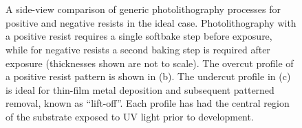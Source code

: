 \documentclass[
  a4paper,
]{scrbook}
\begin{document}
\begin{figure}
\begin{minipage}[t]{0.03\linewidth}
{

}

\end{minipage}%
%
\begin{minipage}[t]{0.01\linewidth}

{\centering 

~

}

\end{minipage}%
%
\begin{minipage}[t]{0.45\linewidth}

{\centering 


}

\end{minipage}%
%
\begin{minipage}[t]{0.01\linewidth}

{\centering 

~

}

\end{minipage}%

\caption[A side-view comparison of generic photolithography processes
for positive and negative resists in the ideal
case.]{\label{fig-photolithography-profiles}A side-view comparison of
generic photolithography processes for positive and negative resists in
the ideal case. Photolithography with a positive resist requires a
single softbake step before exposure, while for negative resists a
second baking step is required after exposure (thicknesses shown are not
to scale). The overcut profile of a positive resist pattern is shown in
(b). The undercut profile in (c) is ideal for thin-film metal deposition
and subsequent patterned removal, known as ``lift-off''. Each profile
has had the central region of the substrate exposed to UV light prior to
development.}

\end{figure}
\end{document}
